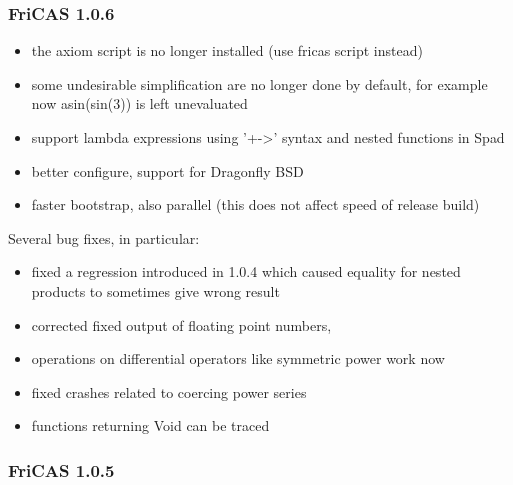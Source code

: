 \subsubsection{FriCAS 1.0.6}

\begin{itemize}
\item the axiom script is no longer installed (use fricas script
  instead)

\item some undesirable simplification are no longer done by default,
  for example now asin(sin(3)) is left unevaluated

\item support lambda expressions using '+->' syntax and nested
  functions in Spad

\item better configure, support for Dragonfly BSD

\item faster bootstrap, also parallel (this does not affect speed of
  release build)
\end{itemize}

Several bug fixes, in particular:

\begin{itemize}
\item fixed a regression introduced in 1.0.4 which caused equality for
  nested products to sometimes give wrong result

\item corrected fixed output of floating point numbers,

\item operations on differential operators like symmetric power work
  now

\item fixed crashes related to coercing power series

\item functions returning Void can be traced
\end{itemize}

\subsubsection{FriCAS 1.0.5}

